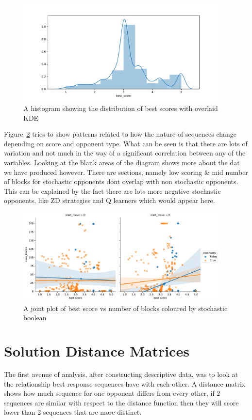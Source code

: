 \begin{figure}[ht]
    \includegraphics[width=0.95\textwidth, center]{./img/descriptive/best_score_hist.pdf}
    \caption{A histogram showing the distribution of best scores with overlaid KDE}\label{fig:best_score_hist}
\end{figure}

Figure~\ref{fig:cor_plot} tries to show patterns related to how the nature of sequences change depending on score and opponent type.
What can be seen is that there are lots of variation and not much in the way of a significant correlation between any of the variables.
Looking at the blank areas of the diagram shows more about the dat we have produced however.
There are sections, namely low scoring \& mid number of blocks for stochastic opponents dont overlap with non stochastic  opponents.
This can be explained by the fact there are lots more negative stochastic opponents, like ZD strategies and Q learners which would appear here. 

\begin{figure}[ht]
    \includegraphics[width=0.95\textwidth, center]{./img/descriptive/cor_plot.pdf}
    \caption{A joint plot of best score vs number of blocks coloured by stochastic boolean}\label{fig:cor_plot}
\end{figure}

\section{Solution Distance Matrices}\label{sec:distance_matracies}
The first avenue of analysis, after constructing descriptive data, was to look at the relationship best response sequences have with each other.
A distance matrix shows how much  sequence for one opponent differs from every other, if 2 sequences are similar with respect to the distance function then they will score lower than 2 sequences that are more distinct.

